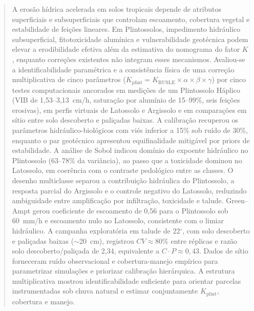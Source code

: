 \documentclass[preprint,review,12pt,authoryear]{elsarticle}
\begin{document}
\begin{frontmatter}
\begin{abstract}
A erosão hídrica acelerada em solos tropicais depende de atributos superficiais e subsuperficiais que controlam escoamento, cobertura vegetal e estabilidade de feições lineares. Em Plintossolos, impedimento hidráulico subsuperficial, fitotoxicidade alumínica e vulnerabilidade geotécnica podem elevar a erodibilidade efetiva além da estimativa do nomograma do fator $K$, enquanto correções existentes não integram esses mecanismos. Avaliou-se a identificabilidade paramétrica e a consistência física de uma correção multiplicativa de cinco parâmetros ($K_{\mathrm{plint}} = K_{\mathrm{RUSLE}} \times \alpha \times \beta \times \gamma$) por cinco testes computacionais ancorados em medições de um Plintossolo Háplico (VIB de 1,53--3,13~cm/h, saturação por alumínio de 15--99\%, seis feições erosivas), em perfis virtuais de Latossolo e Argissolo e em comparações em sítio entre solo descoberto e paliçadas baixas. A calibração recuperou os parâmetros hidráulico-biológicos com viés inferior a 15\% sob ruído de 30\%, enquanto o par geotécnico apresentou equifinalidade mitigável por priors de estabilidade. A análise de Sobol indicou domínio do expoente hidráulico no Plintossolo (63--78\% da variância), ao passo que a toxicidade dominou no Latossolo, em coerência com o contraste pedológico entre as classes. O desenho multiclasse separou a contribuição hidráulica do Plintossolo, a resposta parcial do Argissolo e o controle negativo do Latossolo, reduzindo ambiguidade entre amplificação por infiltração, toxicidade e talude. Green--Ampt gerou coeficiente de escoamento de 0,56 para o Plintossolo sob 60~mm/h e escoamento nulo no Latossolo, consistente com o limiar hidráulico. A campanha exploratória em talude de 22$^{\circ}$, com solo descoberto e paliçadas baixas ($\sim$20~cm), registrou $CV \approx 80\%$ entre réplicas e razão solo descoberto/paliçada de 2,34, equivalente a $C \cdot P \approx 0,43$. Dados de sítio forneceram ruído observacional e cobertura-manejo empírico para parametrizar simulações e priorizar calibração hierárquica. A estrutura multiplicativa mostrou identificabilidade suficiente para orientar parcelas instrumentadas sob chuva natural e estimar conjuntamente $K_{\mathrm{plint}}$, cobertura e manejo.
\end{abstract}


\end{frontmatter}
\end{document}
